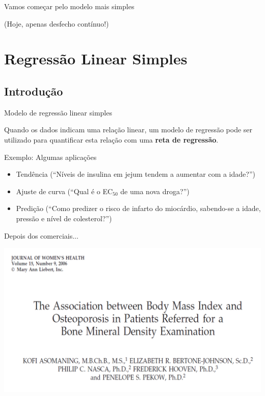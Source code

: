 \documentclass{beamer}
\begin{document}
\begin{frame}{\scriptsize }
  \begin{center}
    \Large Vamos começar pelo modelo mais simples
  \end{center}
  \vfill
  \hfill \footnotesize (Hoje, apenas desfecho contínuo!)
\end{frame}

\section[Regressão]{Regressão Linear Simples}

\subsection{Introdução}

\begin{frame}{\scriptsize Modelo de regressão linear simples}
  \begin{block}{}
    \footnotesize
      Quando os dados indicam uma relação linear, um modelo de regressão pode ser utilizado para quantificar esta relação com uma {\bf reta de regressão}.
    \end{block}
  \begin{exampleblock}{Exemplo: Algumas aplicações}

    \begin{itemize}
      \footnotesize
    \item Tendência (``Níveis de insulina em jejum tendem a aumentar com a idade?'')
    \item Ajuste de curva (``Qual é o EC$_{50}$ de uma nova droga?'')
    \item Predição (``Como predizer o risco de infarto do miocárdio, sabendo-se a idade, pressão e nível de colesterol?'')
    \end{itemize}
  \end{exampleblock}
\end{frame}

\begin{frame}{\scriptsize Depois dos comerciais...}
  \begin{center}
    \includegraphics[width=\textwidth]{Cap18-19/bmi-bmd-title}
  \end{center}
\end{frame}
\end{document}

